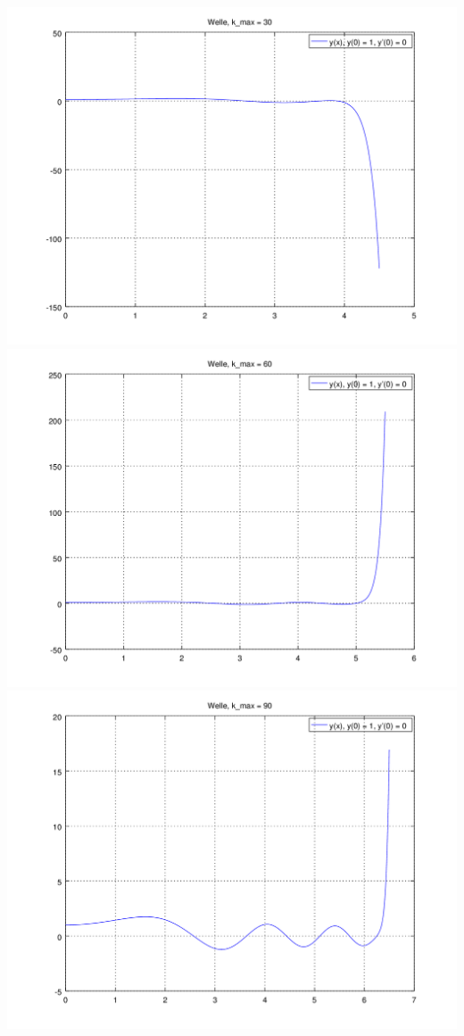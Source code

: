 \begin{refsection}
\includegraphics[scale=0.35]{./wellen/octave/images/kmax/ak30wave.png}
\includegraphics[scale=0.35]{./wellen/octave/images/kmax/ak60wave.png}
\includegraphics[scale=0.35]{./wellen/octave/images/kmax/ak90wave.png}

\end{refsection}
